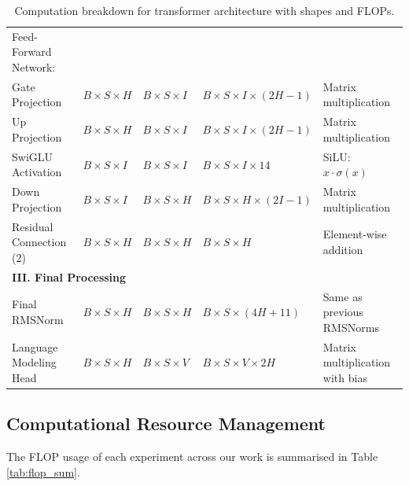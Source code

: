 \documentclass[11pt]{article}
\begin{document}
\begin{landscape}
\begin{table}[h!]
\begin{tabular}{lllll}
\midrule
Feed-Forward Network: & & & & \\
\quad Gate Projection & $B \times S \times H$ & $B \times S \times I$ & $B \times S \times I \times (2H - 1)$ & Matrix multiplication \\
\quad Up Projection & $B \times S \times H$ & $B \times S \times I$ & $B \times S \times I \times (2H - 1)$ & Matrix multiplication \\
\quad SwiGLU Activation & $B \times S \times I$ & $B \times S \times I$ & $B \times S \times I \times 14$ & SiLU: $x \cdot \sigma(x)$ \\
\quad Down Projection & $B \times S \times I$ & $B \times S \times H$ & $B \times S \times H \times (2I - 1)$ & Matrix multiplication \\
\midrule
Residual Connection (2) & $B \times S \times H$ & $B \times S \times H$ & $B \times S \times H$ & Element-wise addition \\
\midrule
\multicolumn{5}{l}{\textbf{III. Final Processing}} \\
\midrule
Final RMSNorm & $B \times S \times H$ & $B \times S \times H$ & $B \times S \times (4H + 11)$ & Same as previous RMSNorms \\
\midrule
Language Modeling Head & $B \times S \times H$ & $B \times S \times V$ & $B \times S \times V \times 2H$ & Matrix multiplication with bias \\
\bottomrule
\end{tabular}
\caption{Computation breakdown for transformer architecture with shapes and FLOPs.}
\label{tab:transformer-computation}
\end{table}
\end{landscape}


\subsection{Computational Resource Management}

The FLOP usage of each experiment across our work is summarised in Table \ref{tab:flop_sum}.
\end{document}
